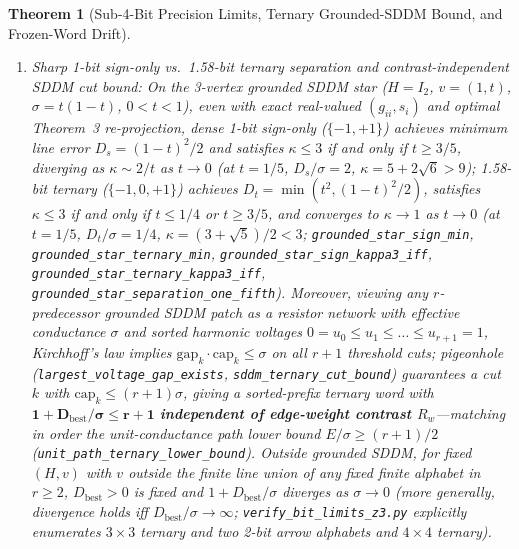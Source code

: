 \documentclass[10pt]{article}
\newtheorem{theorem}{Theorem}
\begin{document}
\begin{theorem}[Sub-4-Bit Precision Limits, Ternary Grounded-SDDM Bound, and Frozen-Word Drift]
\begin{enumerate}
  \item \emph{Sharp 1-bit sign-only vs.\ 1.58-bit ternary separation and contrast-independent SDDM cut bound:} On the 3-vertex grounded SDDM star ($H = I_2$, $v = (1, t)$, $\sigma = t(1-t)$, $0 < t < 1$), even with exact real-valued $(g_{ii}, s_i)$ and optimal Theorem~3 re-projection, dense 1-bit sign-only ($\{-1, +1\}$) achieves minimum line error $D_s = (1 - t)^2/2$ and satisfies $\kappa \le 3$ \emph{if and only if} $t \ge 3/5$, diverging as $\kappa \sim 2/t$ as $t \to 0$ (at $t = 1/5$, $D_s/\sigma = 2$, $\kappa = 5 + 2\sqrt{6} > 9$); 1.58-bit ternary ($\{-1, 0, +1\}$) achieves $D_t = \min(t^2, (1 - t)^2/2)$, satisfies $\kappa \le 3$ \emph{if and only if} $t \le 1/4$ or $t \ge 3/5$, and converges to $\kappa \to 1$ as $t \to 0$ (at $t = 1/5$, $D_t/\sigma = 1/4$, $\kappa = (3 + \sqrt{5})/2 < 3$; \texttt{grounded\_star\_sign\_min}, \texttt{grounded\_star\_ternary\_min}, \texttt{grounded\_star\_sign\_kappa3\_iff}, \texttt{grounded\_star\_ternary\_kappa3\_iff}, \texttt{grounded\_star\_separation\_one\_fifth}). Moreover, viewing any $r$-predecessor grounded SDDM patch as a resistor network with effective conductance $\sigma$ and sorted harmonic voltages $0 = u_0 \le u_1 \le \dots \le u_{r+1} = 1$, Kirchhoff's law implies $\mathrm{gap}_k \cdot \mathrm{cap}_k \le \sigma$ on all $r + 1$ threshold cuts; pigeonhole (\texttt{largest\_voltage\_gap\_exists}, \texttt{sddm\_ternary\_cut\_bound}) guarantees a cut $k$ with $\mathrm{cap}_k \le (r + 1)\sigma$, giving a sorted-prefix ternary word with $\mathbf{1 + D_{\mathrm{best}}/\sigma \le r + 1}$ \textbf{independent of edge-weight contrast $R_w$}---matching in order the unit-conductance path lower bound $E/\sigma \ge (r + 1)/2$ (\texttt{unit\_path\_ternary\_lower\_bound}). Outside grounded SDDM, for fixed $(H, v)$ with $v$ outside the finite line union of any fixed finite alphabet in $r \ge 2$, $D_{\mathrm{best}} > 0$ is fixed and $1 + D_{\mathrm{best}}/\sigma$ diverges as $\sigma \to 0$ (more generally, divergence holds iff $D_{\mathrm{best}}/\sigma \to \infty$; \texttt{verify\_bit\_limits\_z3.py} explicitly enumerates $3\times 3$ ternary and two 2-bit arrow alphabets and $4\times 4$ ternary).

\end{enumerate}
\end{theorem}
\end{document}
